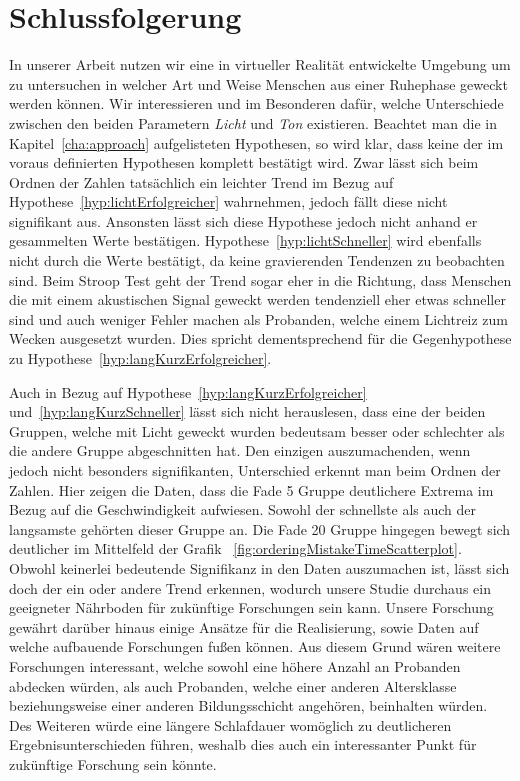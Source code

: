 \chapter{Schlussfolgerung}


In unserer Arbeit nutzen wir eine in virtueller Realität entwickelte Umgebung um zu untersuchen in welcher Art und Weise Menschen aus einer Ruhephase geweckt werden können.
Wir interessieren und im Besonderen dafür, welche Unterschiede zwischen den beiden Parametern \textit{Licht} und \textit{Ton} existieren. 
Beachtet man die in Kapitel~\ref{cha:approach} aufgelisteten Hypothesen, so wird klar, dass keine der im voraus definierten Hypothesen komplett bestätigt wird. 
Zwar lässt sich beim Ordnen der Zahlen tatsächlich ein leichter Trend im Bezug auf Hypothese~\ref{hyp:lichtErfolgreicher} wahrnehmen, jedoch fällt diese nicht signifikant aus. 
Ansonsten lässt sich diese Hypothese jedoch nicht anhand er gesammelten Werte bestätigen. 
Hypothese~\ref{hyp:lichtSchneller} wird ebenfalls nicht durch die Werte bestätigt, da keine gravierenden Tendenzen zu beobachten sind.
Beim Stroop Test geht der Trend sogar eher in die Richtung, dass Menschen die mit einem akustischen Signal geweckt werden tendenziell eher etwas schneller sind und auch weniger Fehler machen als Probanden, welche einem Lichtreiz zum Wecken ausgesetzt wurden.
Dies spricht dementsprechend für die Gegenhypothese zu Hypothese~\ref{hyp:langKurzErfolgreicher}.

Auch in Bezug auf Hypothese~\ref{hyp:langKurzErfolgreicher} und~\ref{hyp:langKurzSchneller} lässt sich nicht herauslesen, dass eine der beiden Gruppen, welche mit Licht geweckt wurden bedeutsam besser oder schlechter als die andere Gruppe abgeschnitten hat. 
Den einzigen auszumachenden, wenn jedoch nicht besonders signifikanten, Unterschied erkennt man beim Ordnen der Zahlen. 
Hier zeigen die Daten, dass die Fade 5 Gruppe deutlichere Extrema im Bezug auf die Geschwindigkeit aufwiesen. 
Sowohl der schnellste als auch der langsamste gehörten dieser Gruppe an. 
Die Fade 20 Gruppe hingegen bewegt sich deutlicher im Mittelfeld der Grafik ~\ref{fig:orderingMistakeTimeScatterplot}.
Obwohl keinerlei bedeutende Signifikanz in den Daten auszumachen ist, lässt sich doch der ein oder andere Trend erkennen, wodurch unsere Studie durchaus ein geeigneter Nährboden für zukünftige Forschungen sein kann. Unsere Forschung gewährt darüber hinaus einige Ansätze für die Realisierung, sowie Daten auf welche aufbauende Forschungen fußen können. Aus diesem Grund wären weitere Forschungen interessant, welche sowohl eine höhere Anzahl an Probanden abdecken würden, als auch Probanden, welche einer anderen Altersklasse beziehungsweise einer anderen Bildungsschicht angehören, beinhalten würden. Des Weiteren würde eine längere Schlafdauer womöglich zu deutlicheren Ergebnisunterschieden führen, weshalb dies auch ein interessanter Punkt für zukünftige Forschung sein könnte.


